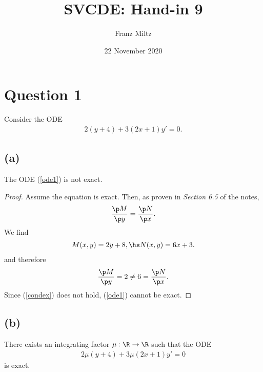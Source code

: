 \documentclass{article}
\begin{document}
\title{SVCDE: Hand-in 9}
\author{Franz Miltz}
\date{22 November 2020}
\maketitle


\section*{Question 1}


Consider the ODE
\begin{align}
	\label{ode1}
	2(y+4)+3(2x+1)y' = 0.
\end{align}


\subsection*{(a)}

\begin{claim*}
	The ODE (\ref{ode1}) is not exact.
\end{claim*}
\begin{proof}
	Assume the equation is exact. Then, as proven in \emph{Section 6.5} of the notes,
	\begin{align}
		\label{condex}
		\frac{\p M}{\p y} = \frac{\p N}{\p x}.
	\end{align}
	We find
	\begin{align*}
		M(x,y) = 2y+8,\hs N(x,y)=6x+3.
	\end{align*}
	and therefore
	\begin{align*}
		\frac{\p M}{\p y} = 2 \not= 6 = \frac{\p N}{\p x}.
	\end{align*}
	Since (\ref{condex}) does not hold, (\ref{ode1}) cannot be exact.
\end{proof}


\subsection*{(b)}


\begin{claim*}
	There exists an integrating factor $\mu:\R\to\R$ such that the ODE
	\begin{align}
		\label{ode2}
		2\mu(y+4)+3\mu(2x+1)y'=0
	\end{align}
	is exact.
\end{claim*}
\end{document}
